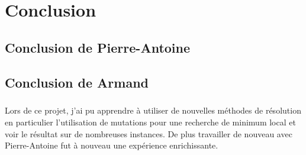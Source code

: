\chapter{Conclusion}

\paragraph{}

\section{Conclusion de Pierre-Antoine}

\section{Conclusion de Armand}
\paragraph{}
Lors de ce projet, j'ai pu apprendre à utiliser de nouvelles méthodes de résolution en particulier l'utilisation de mutations pour une recherche de minimum local et voir le résultat sur de nombreuses instances. De plus travailler de nouveau avec Pierre-Antoine fut à nouveau une expérience enrichissante. 
